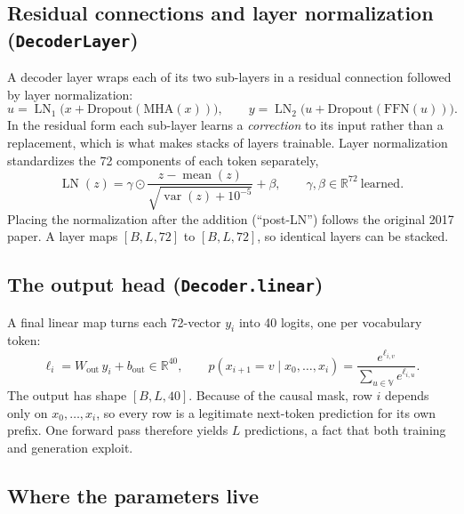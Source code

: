 \documentclass[11pt]{article}
\newcommand{\code}[1]{\texttt{#1}}
\newcommand{\V}{\mathbb{V}}
\newcommand{\R}{\mathbb{R}}
\newcommand{\LN}{\operatorname{LN}}
\begin{document}
\subsection{Residual connections and layer normalization (\code{DecoderLayer})}

A decoder layer wraps each of its two sub-layers in a residual connection followed by
layer normalization:
\begin{equation}
  u=\LN_1\big(x+\mathrm{Dropout}(\mathrm{MHA}(x))\big),\qquad
  y=\LN_2\big(u+\mathrm{Dropout}(\mathrm{FFN}(u))\big).
\end{equation}
In the residual form each sub-layer learns a \emph{correction} to its input rather than
a replacement, which is what makes stacks of layers trainable. Layer normalization
standardizes the 72 components of each token separately,
\begin{equation}
  \LN(z)=\gamma\odot\frac{z-\operatorname{mean}(z)}{\sqrt{\operatorname{var}(z)+10^{-5}}}+\beta,
  \qquad \gamma,\beta\in\R^{72}\ \text{learned}.
\end{equation}
Placing the normalization after the addition (``post-LN'') follows the original 2017
paper. A layer maps $[B,L,72]$ to $[B,L,72]$, so identical layers can be stacked.

\subsection{The output head (\code{Decoder.linear})}

A final linear map turns each 72-vector $y_i$ into 40 logits, one per vocabulary token:
\begin{equation}
  \ell_i=W_{\text{out}}\,y_i+b_{\text{out}}\in\R^{40},\qquad
  p(x_{i+1}=v\mid x_0,\dots,x_i)=\frac{e^{\ell_{i,v}}}{\sum_{u\in\V}e^{\ell_{i,u}}} .
\end{equation}
The output has shape $[B,L,40]$. Because of the causal mask, row $i$ depends only on
$x_0,\dots,x_i$, so every row is a legitimate next-token prediction for its own
prefix. One forward pass therefore yields $L$ predictions, a fact that both training
and generation exploit.

\subsection{Where the parameters live}
\end{document}
